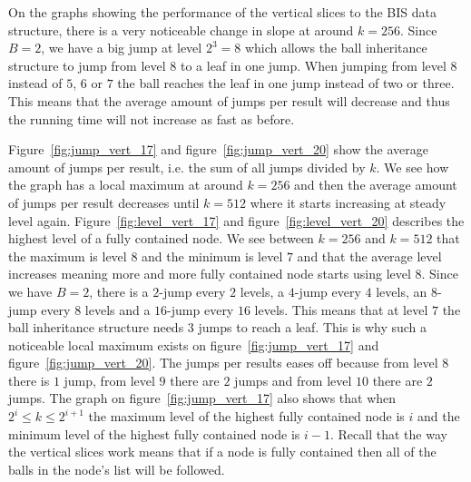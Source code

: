 On the graphs showing the performance of the vertical slices to the BIS data structure, there is a very noticeable change in slope at around $k=256$. Since $B=2$, we have a big jump at level $2^3 = 8$ which allows the ball inheritance structure to jump from level $8$ to a leaf in one jump. When jumping from level $8$ instead of $5$, $6$ or $7$ the ball reaches the leaf in one jump instead of two or three. This means that the average amount of jumps per result will decrease and thus the running time will not increase as fast as before.

Figure~\ref{fig:jump_vert_17} and figure~\ref{fig:jump_vert_20} show the average amount of jumps per result, i.e. the sum of all jumps divided by $k$. We see how the graph has a local maximum at around $k=256$ and then the average amount of jumps per result decreases until $k=512$ where it starts increasing at steady level again. Figure~\ref{fig:level_vert_17} and figure~\ref{fig:level_vert_20} describes the highest level of a fully contained node. We see between $k=256$ and $k=512$ that the maximum is level $8$ and the minimum is level $7$ and that the average level increases meaning more and more fully contained node starts using level $8$. Since we have $B=2$, there is a $2$-jump every $2$ levels, a $4$-jump every $4$ levels, an $8$-jump every $8$ levels and a $16$-jump every $16$ levels. This means that at level $7$ the ball inheritance structure needs $3$ jumps to reach a leaf. This is why such a noticeable local maximum exists on figure~\ref{fig:jump_vert_17} and figure~\ref{fig:jump_vert_20}. The jumps per results eases off because from level $8$ there is $1$ jump, from level $9$ there are $2$ jumps and from level $10$ there are $2$ jumps. The graph on figure~\ref{fig:jump_vert_17} also shows that when $2^i \leq k \leq 2^{i+1}$ the maximum level of the highest fully contained node is $i$ and the minimum level of the highest fully contained node is $i-1$. Recall that the way the vertical slices work means that if a node is fully contained then all of the balls in the node's list will be followed.




